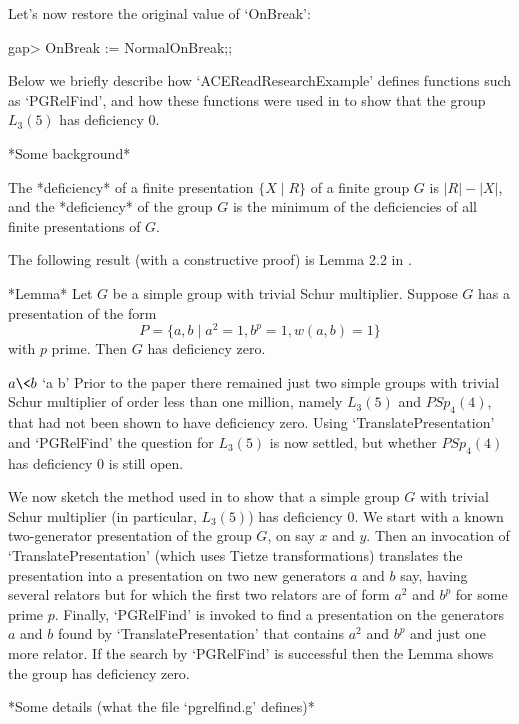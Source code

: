 Let's now restore the original value of `OnBreak':

\beginexample
gap> OnBreak := NormalOnBreak;;
\endexample


Below  we  briefly  describe  how   `ACEReadResearchExample'   defines
functions such as `PGRelFind', and how these functions  were  used  in
\cite{CHHR01} to show that the group $L_3(5)$ has deficiency 0.

*Some background*

The *deficiency* of a finite presentation $\{X \mid R\}$ of  a  finite
group $G$ is $|R| - |X|$, and the *deficiency* of the group $G$ is the
minimum of the deficiencies of all finite presentations of $G$.

The following result (with a  constructive  proof)  is  Lemma  2.2  in
\cite{CHHR01}.

*Lemma*
Let $G$ be a simple group with trivial Schur multiplier.  Suppose  $G$
has a presentation of the form
$$
P = \{ a, b \mid a^2=1, b^p=1, w(a,b)=1\}
$$
with $p$ prime. Then $G$ has deficiency zero.

$a \< b$ `a \< b'
Prior to the paper \cite{CHHR01} there remained just two simple groups
with trivial Schur multiplier of order less than one  million,  namely
$L_3(5)$ and $PSp_4(4)$, that had not been shown  to  have  deficiency
zero. Using `TranslatePresentation' and `PGRelFind' the  question  for
$L_3(5)$ is now settled, but whether $PSp_4(4)$ has  deficiency  0  is
still open.

We now sketch the method used in \cite{CHHR01} to show that  a  simple
group $G$ with trivial Schur multiplier (in particular, $L_3(5)$)  has
deficiency 0. We start with a known two-generator presentation of  the
group  $G$,  on   say   $x$   and   $y$.   Then   an   invocation   of
`TranslatePresentation' (which uses Tietze transformations) translates
the presentation into a presentation on two new generators $a$ and $b$
say, having several relators but for which the first two relators  are
of form $a^2$ and $b^p$ for some prime $p$.  Finally,  `PGRelFind'  is
invoked to find a presentation on the generators $a$ and $b$ found  by
`TranslatePresentation' that contains $a^2$ and  $b^p$  and  just  one
more relator. If the search by  `PGRelFind'  is  successful  then  the
Lemma shows the group has deficiency zero.


*Some details (what the file `pgrelfind.g' defines)*

